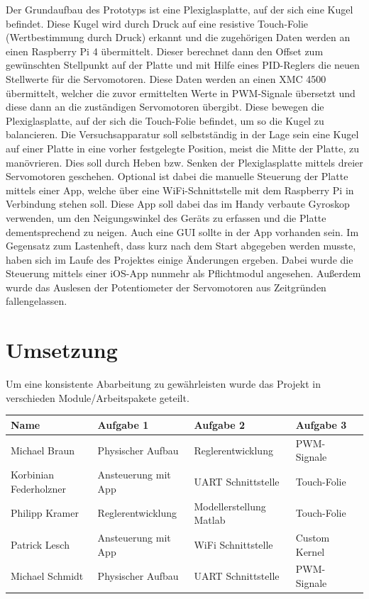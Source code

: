 \documentclass[12pt,a4paper,bibliography=totoc,listof=totoc]{scrartcl}
\begin{document}
Der Grundaufbau des Prototyps ist eine Plexiglasplatte, auf der sich 
eine Kugel befindet. Diese Kugel wird durch Druck auf eine resistive Touch-Folie (Wertbestimmung durch 
Druck) erkannt und die zugehörigen Daten werden an einen Raspberry Pi 4 übermittelt. Dieser berechnet dann 
den Offset zum gewünschten Stellpunkt auf der Platte und mit Hilfe eines PID-Reglers die neuen Stellwerte 
für die Servomotoren. Diese Daten werden an einen XMC 4500 übermittelt, welcher die zuvor ermittelten Werte 
in PWM-Signale übersetzt und diese dann an die zuständigen Servomotoren übergibt. Diese bewegen die 
Plexiglasplatte, auf der sich die Touch-Folie befindet, um so die Kugel zu balancieren.
Die Versuchsapparatur soll selbstständig in der Lage sein eine Kugel auf einer Platte in eine vorher 
festgelegte Position, meist die Mitte der Platte, zu manövrieren. Dies soll durch Heben bzw. Senken der 
Plexiglasplatte mittels dreier Servomotoren geschehen. Optional ist dabei die manuelle Steuerung der 
Platte mittels einer App, welche über eine WiFi-Schnittstelle mit dem Raspberry Pi in Verbindung stehen 
soll. Diese App soll dabei das im Handy verbaute Gyroskop verwenden, um den Neigungswinkel des Geräts zu 
erfassen und die Platte dementsprechend zu neigen. Auch eine GUI sollte in der App vorhanden sein.
\newline Im Gegensatz zum Lastenheft, dass kurz nach dem Start abgegeben werden musste, haben sich im 
Laufe des Projektes einige Änderungen ergeben. Dabei wurde die Steuerung mittels einer iOS-App nunmehr 
als Pflichtmodul angesehen. Außerdem wurde das Auslesen der Potentiometer der Servomotoren aus Zeitgründen 
fallengelassen.
\pagebreak
\section {Umsetzung}
Um eine konsistente Abarbeitung zu gewährleisten wurde das Projekt in verschieden Module/Arbeitspakete 
geteilt.

\begin{tabularx}{\textwidth}{p{}|X|X|X|X|}
\hline
Name 					& Aufgabe 1 			& Aufgabe 2 				& Aufgabe 3  \\
\hline
Michael Braun			& Physischer Aufbau		& Reglerentwicklung			& PWM-Signale \\
\hline
Korbinian Federholzner	& Ansteuerung mit App	& UART Schnittstelle		& Touch-Folie \\
\hline
Philipp Kramer			&Reglerentwicklung		& Modellerstellung Matlab	& Touch-Folie\\
\hline
Patrick Lesch			& Ansteuerung mit App	& WiFi Schnittstelle		& Custom Kernel\\
\hline
Michael Schmidt			& Physischer Aufbau		& UART Schnittstelle		& PWM-Signale\\
\hline
\end{tabularx}
\end{document}
